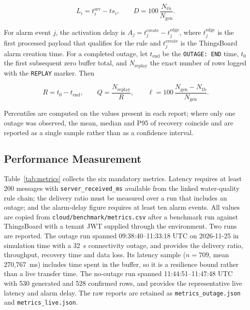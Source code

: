 \documentclass[conference]{IEEEtran}
\begin{document}
\begin{equation}
L_i=t^{\mathrm{srv}}_i-ts_i,\qquad
D=100\,\frac{N_{\mathrm{tb}}}{N_{\mathrm{gen}}}.
\end{equation}

For alarm event $j$, the activation delay is
$A_j=t^{\mathrm{create}}_j-t^{\mathrm{edge}}_j$, where $t^{\mathrm{edge}}_j$ is the
first processed payload that qualifies for the rule and $t^{\mathrm{create}}_j$ is
the ThingsBoard alarm creation time. For a completed outage, let
$t_{\mathrm{end}}$ be the \texttt{OUTAGE: END} time, $t_0$ the first subsequent zero
buffer total, and $N_{\mathrm{replay}}$ the exact number of rows logged with the
\texttt{REPLAY} marker. Then

\begin{equation}
R=t_0-t_{\mathrm{end}},\qquad
Q=\frac{N_{\mathrm{replay}}}{R},\qquad
\ell=100\,\frac{N_{\mathrm{gen}}-N_{\mathrm{tb}}}{N_{\mathrm{gen}}}.
\end{equation}

Percentiles are computed on the values present in each report; where only one
outage was observed, the mean, median and P95 of recovery coincide and are
reported as a single sample rather than as a confidence interval.

\subsection{Performance Measurement}
\label{sec:performance}

Table~\ref{tab:metrics} collects the six mandatory metrics. Latency requires at least
200 messages with \texttt{server\_received\_ms} available from the linked water-quality
rule chain; the delivery ratio must be measured over a run that includes an outage; and
the alarm-delay figure requires at least ten alarm events. All values are copied from
\texttt{cloud/benchmark/metrics.csv} after a benchmark run against ThingsBoard with a
tenant JWT supplied through the environment. Two runs are reported. The outage run
spanned 09:38:40--11:33:18 UTC on 2026-11-25 in simulation time with a 32~s
connectivity outage, and provides the delivery ratio, throughput, recovery time
and data loss. Its latency sample ($n=709$, mean 270,767~ms) includes time spent in
the buffer, so it is a resilience bound rather than a live transfer time. The
no-outage run spanned 11:44:51--11:47:48 UTC with 530 generated and 528 confirmed
rows, and provides the representative live latency and alarm delay. The raw reports
are retained as \texttt{metrics\_outage.json} and \texttt{metrics\_live.json}.
\end{document}
